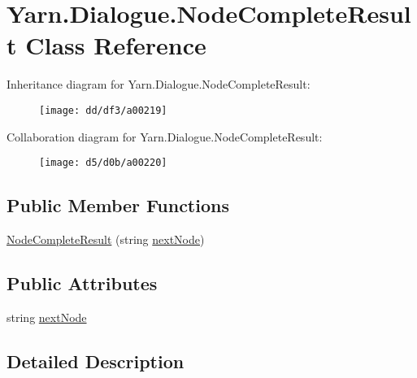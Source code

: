 \hypertarget{a00055}{\section{Yarn.\-Dialogue.\-Node\-Complete\-Result Class Reference}
\label{a00055}
}


Inheritance diagram for Yarn.\-Dialogue.\-Node\-Complete\-Result\-:
\nopagebreak
\begin{figure}[H]
\begin{center}
\leavevmode
\texttt{[image: dd/df3/a00219]}
\end{center}
\end{figure}


Collaboration diagram for Yarn.\-Dialogue.\-Node\-Complete\-Result\-:
\nopagebreak
\begin{figure}[H]
\begin{center}
\leavevmode
\texttt{[image: d5/d0b/a00220]}
\end{center}
\end{figure}
\subsection*{Public Member Functions}
\begin{DoxyCompactItemize}
\item 
\hyperlink{a00055_a88c81469a69987c05aa92780c5a5c1f9}{Node\-Complete\-Result} (string \hyperlink{a00055_ad48b37b51066b94cd48c58626ac0e774}{next\-Node})
\end{DoxyCompactItemize}
\subsection*{Public Attributes}
\begin{DoxyCompactItemize}
\item 
string \hyperlink{a00055_ad48b37b51066b94cd48c58626ac0e774}{next\-Node}
\end{DoxyCompactItemize}


\subsection{Detailed Description}


